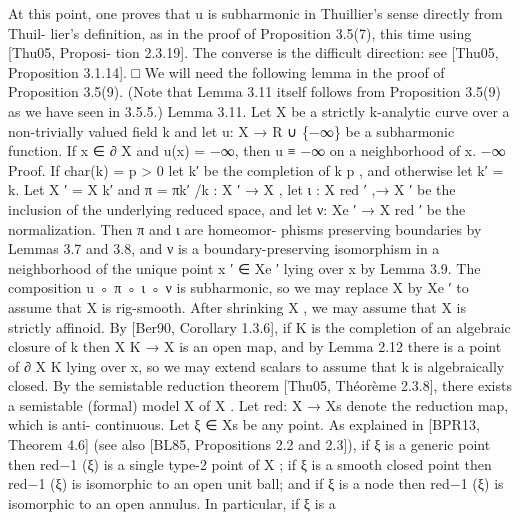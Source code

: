 \documentclass[
  10pt,
]{article}
\newenvironment{Shaded}{}{}
\newcommand{\NormalTok}[1]{#1}
\begin{document}
\begin{Shaded}
\begin{Highlighting}[]
\NormalTok{   At this point, one proves that u is subharmonic in Thuillier’s sense directly from Thuil{-}}
\NormalTok{lier’s definition, as in the proof of Proposition 3.5(7), this time using [Thu05, Proposi{-}}
\NormalTok{tion 2.3.19]. The converse is the difficult direction: see [Thu05, Proposition 3.1.14]. □}
\NormalTok{  We will need the following lemma in the proof of Proposition 3.5(9). (Note that}
\NormalTok{Lemma 3.11 itself follows from Proposition 3.5(9) as we have seen in 3.5.5.)}
\NormalTok{Lemma 3.11. Let X be a strictly k{-}analytic curve over a non{-}trivially valued field k and let}
\NormalTok{u: X → R ∪ \{−∞\} be a subharmonic function. If x ∈ ∂ X and u(x) = −∞, then u ≡ −∞}
\NormalTok{on a neighborhood of x.}
\NormalTok{                                                          −∞}
\NormalTok{Proof. If char(k) = p \textgreater{} 0 let k′ be the completion of k p , and otherwise let k′ = k. Let}
\NormalTok{X ′ = X k′ and π = πk′ /k : X ′ → X , let ι : X red}
\NormalTok{                                                ′}
\NormalTok{                                                     ,→ X ′ be the inclusion of the underlying}
\NormalTok{reduced space, and let ν: Xe ′ → X red}
\NormalTok{                                     ′}
\NormalTok{                                        be the normalization. Then π and ι are homeomor{-}}
\NormalTok{phisms preserving boundaries by Lemmas 3.7 and 3.8, and ν is a boundary{-}preserving}
\NormalTok{isomorphism in a neighborhood of the unique point x ′ ∈ Xe ′ lying over x by Lemma 3.9.}
\NormalTok{The composition u ◦ π ◦ ι ◦ ν is subharmonic, so we may replace X by Xe ′ to assume that}
\NormalTok{X is rig{-}smooth. After shrinking X , we may assume that X is strictly affinoid. By [Ber90,}
\NormalTok{Corollary 1.3.6], if K is the completion of an algebraic closure of k then X K → X is an}
\NormalTok{open map, and by Lemma 2.12 there is a point of ∂ X K lying over x, so we may extend}
\NormalTok{scalars to assume that k is algebraically closed.}
\NormalTok{   By the semistable reduction theorem [Thu05, Théorème 2.3.8], there exists a semistable}
\NormalTok{(formal) model X of X . Let red: X → Xs denote the reduction map, which is anti{-}}
\NormalTok{continuous. Let ξ ∈ Xs be any point. As explained in [BPR13, Theorem 4.6] (see also}
\NormalTok{[BL85, Propositions 2.2 and 2.3]), if ξ is a generic point then red−1 (ξ) is a single type{-}2}
\NormalTok{point of X ; if ξ is a smooth closed point then red−1 (ξ) is isomorphic to an open unit ball;}
\NormalTok{and if ξ is a node then red−1 (ξ) is isomorphic to an open annulus. In particular, if ξ is a}

\end{Highlighting}
\end{Shaded}
\end{document}

